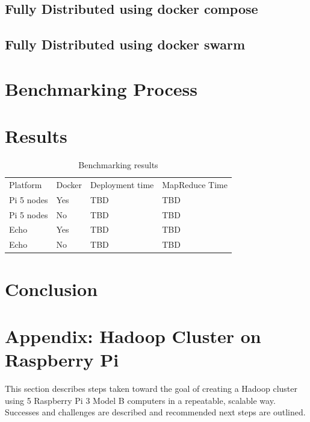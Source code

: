 \subsection{Fully Distributed using docker compose}


\subsection{Fully Distributed using docker swarm}


\section{Benchmarking Process}


\section{Results}

\begin{table}[hbt]
\centering
\caption{Benchmarking results}\label{t:results-table}
\begin{tabular}{llll}
Platform    & Docker & Deployment time & MapReduce Time \\
Pi 5 nodes  & Yes    & TBD             & TBD            \\
Pi 5 nodes  & No     & TBD             & TBD            \\
Echo        & Yes    & TBD             & TBD            \\
Echo        & No     & TBD             & TBD            \\
\end{tabular}
\end{table}



\section{Conclusion}


\section{Appendix: Hadoop Cluster on Raspberry Pi}
This section describes steps taken toward the goal of creating a
Hadoop cluster using 5 Raspberry Pi 3 Model B computers in a
repeatable, scalable way. Successes and challenges are described and
recommended next steps are outlined.

